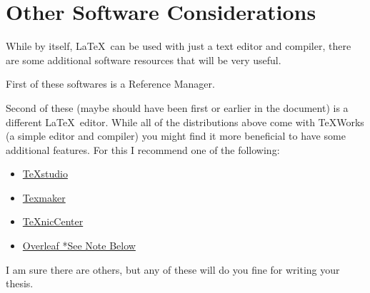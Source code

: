 	\section{Other Software Considerations}
		While by itself, \LaTeX\ can be used with just a text editor and compiler, there are some additional software resources that will be very useful.
		
		First of these softwares is a Reference Manager.
		
		
		Second of these (maybe should have been first or earlier in the document) is a different \LaTeX\ editor.
		While all of the distributions above come with TeXWorks (a simple editor and compiler) you might find it more beneficial to have some additional features.
		For this I recommend one of the following:
		\begin{itemize}
			\item \href{https://www.texstudio.org/}{TeXstudio}
			\item \href{http://www.xm1math.net/texmaker/}{Texmaker}
			\item \href{http://www.texniccenter.org/}{TeXnicCenter}
			\item \href{https://www.overleaf.com/}{Overleaf *See Note Below}
		\end{itemize}
		I am sure there are others, but any of these will do you fine for writing your thesis.
		

